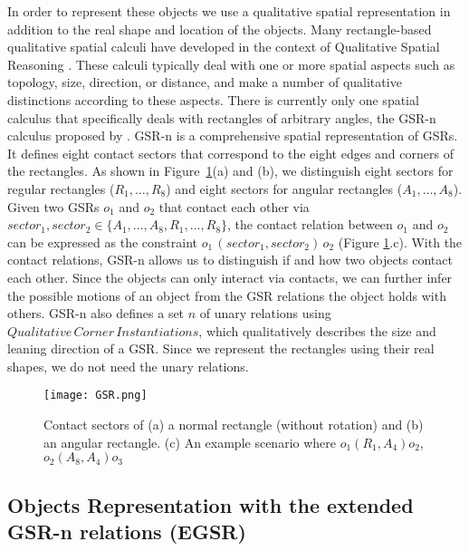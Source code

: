 \documentclass[letterpaper]{article}
\begin{document}
In order to represent these objects we use a qualitative spatial representation in addition to the real shape and location of the objects. Many rectangle-based qualitative spatial calculi \cite{balbiani1998model,cohn2012thinking,sokeh2013efficient} have developed in the context of Qualitative Spatial Reasoning \cite{cohn2008qualitative}. These calculi typically deal with one or more spatial aspects such as topology, size, direction, or distance, and make a number of qualitative distinctions according to these aspects. There is currently only one spatial calculus that specifically deals with rectangles of arbitrary angles, the GSR-n calculus proposed by \cite{Ge2013}. GSR-n is a comprehensive spatial representation of GSRs. It defines eight contact sectors that correspond to the eight edges and corners of the rectangles. As shown in Figure~\ref{GSR}(a) and (b), we distinguish eight sectors for regular rectangles ($R_1,\ldots,R_8$) and eight sectors for angular rectangles ($A_1,\ldots,A_8$). Given two GSRs $o_1$ and $o_2$ that contact each other via $sector_1, sector_2 \in \{A_1, ..., A_8, R_1, ..., R_8\}$, the contact relation between $o_1$ and $o_2$ can be expressed as the constraint $o_1 \, (sector_1, sector_2) \, o_2$ (Figure \ref{GSR}.c). With the contact relations, GSR-n allows us to distinguish if and how two objects contact each other. Since the objects can only interact via contacts, we can further infer the possible motions of an object from the GSR relations the object holds with others. GSR-n also defines a set $n$ of unary relations using  $Qualitative\,Corner\,Instantiations$, which qualitatively describes the size and leaning direction of a GSR. Since we represent the rectangles using their real shapes, we do not need the unary relations. 
\begin{figure}[h!]
\centering\texttt{[image: GSR.png]}\caption{Contact sectors of (a) a normal rectangle (without rotation) and (b) an angular rectangle. (c) An example scenario where $o_1 (R_1, A_4) o_2$, $o_2 (A_8, A_4) o_3$}
\label{GSR}
\end{figure}

\subsection{Objects Representation with the extended GSR-n relations (EGSR)}
\end{document}
